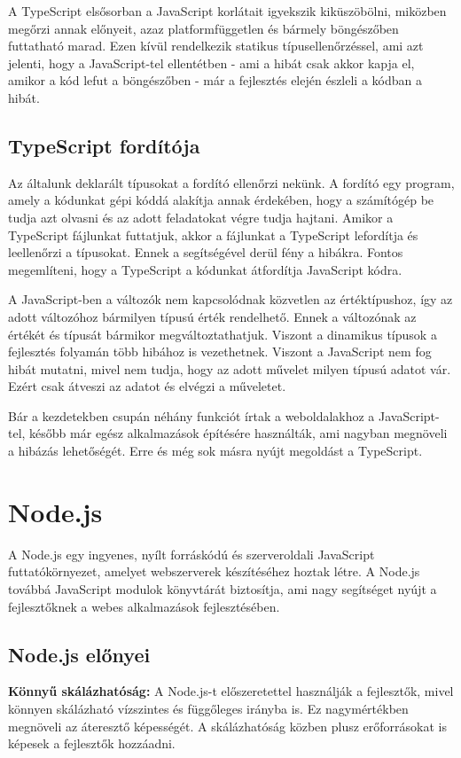 A TypeScript elsősorban a JavaScript korlátait igyekszik kiküszöbölni, miközben megőrzi annak előnyeit, azaz platformfüggetlen és bármely böngészőben futtatható marad. Ezen kívül rendelkezik statikus típusellenőrzéssel, ami azt jelenti, hogy a JavaScript-tel ellentétben - ami a hibát csak akkor kapja el, amikor a kód lefut a böngészőben - már a fejlesztés elején észleli a kódban a hibát.

\subsection{TypeScript fordítója}
Az általunk deklarált típusokat a fordító ellenőrzi nekünk. A fordító egy program, amely a kódunkat gépi kóddá alakítja annak érdekében, hogy a számítógép be tudja azt olvasni és az adott feladatokat végre tudja hajtani. Amikor a TypeScript fájlunkat futtatjuk, akkor a fájlunkat a TypeScript lefordítja és leellenőrzi a típusokat. Ennek a segítségével derül fény a hibákra. Fontos megemlíteni, hogy a TypeScript a kódunkat átfordítja JavaScript kódra.

A JavaScript-ben a változók nem kapcsolódnak közvetlen az értéktípushoz, így az adott változóhoz bármilyen típusú érték rendelhető. Ennek a változónak az értékét és típusát bármikor megváltoztathatjuk. Viszont a dinamikus típusok a fejlesztés folyamán több hibához is vezethetnek. Viszont a JavaScript nem fog hibát mutatni, mivel nem tudja, hogy az adott művelet milyen típusú adatot vár. Ezért csak átveszi az adatot és elvégzi a műveletet.

Bár a kezdetekben csupán néhány funkciót írtak a weboldalakhoz a JavaScript-tel, később már egész alkalmazások építésére használták, ami nagyban megnöveli a hibázás lehetőségét. Erre és még sok másra nyújt megoldást a TypeScript. 

\section{Node.js}
A Node.js \cite{7}\cite{8}\cite{9} egy ingyenes, nyílt forráskódú és szerveroldali JavaScript futtatókörnyezet, amelyet webszerverek készítéséhez hoztak létre. A Node.js továbbá JavaScript modulok könyvtárát biztosítja, ami nagy segítséget nyújt a fejlesztőknek a webes alkalmazások fejlesztésében. 
\subsection{Node.js előnyei}
\textbf{Könnyű skálázhatóság:} A Node.js-t előszeretettel használják a fejlesztők, mivel könnyen skálázható vízszintes és függőleges irányba is. Ez nagymértékben megnöveli az áteresztő képességét. A skálázhatóság közben plusz erőforrásokat is képesek a fejlesztők hozzáadni.\\

